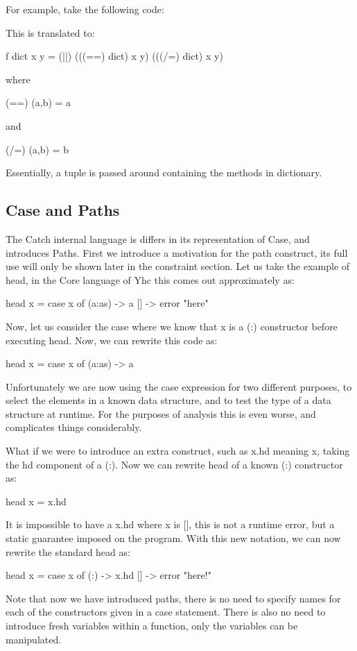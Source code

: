 \documentclass[preprint]{sigplanconf}
\begin{document}
For example, take the following code:


This is translated to:

f dict x y = (||) (((==) dict) x y) (((/=) dict) x y)

where

(==) (a,b) = a

and

(/=) (a,b) = b

Essentially, a tuple is passed around containing the methods in dictionary.


\subsection{Case and Paths}

The Catch internal language is differs in its representation of Case, and
introduces Paths. First we introduce a motivation for the path construct, its
full use will only be shown later in the constraint section. Let us take the
example of head, in the Core language of Yhc this comes out approximately as:

head x = case x of
            (a:as) -> a
            [] -> error "here"

Now, let us consider the case where we know that x is a (:) constructor before
executing head. Now, we can rewrite this code as:

head x = case x of
            (a:as) -> a

Unfortunately we are now using the case expression for two different purposes,
to select the elements in a known data structure, and to test the type of a
data structure at runtime. For the purposes of analysis this is even worse, and
complicates things considerably.

What if we were to introduce an extra construct, such as x.hd meaning x, taking
the hd component of a (:). Now we can rewrite head of a known (:) constructor
as:

head x = x.hd

It is impossible to have a x.hd where x is [], this is not a runtime error, but
a static guarantee imposed on the program. With this new notation, we can now
rewrite the standard head as:

head x = case x of
            (:) -> x.hd
            [] -> error "here!"

Note that now we have introduced paths, there is no need to specify names for
each of the constructors given in a case statement. There is also no need to
introduce fresh variables within a function, only the variables can be
manipulated.
\end{document}
